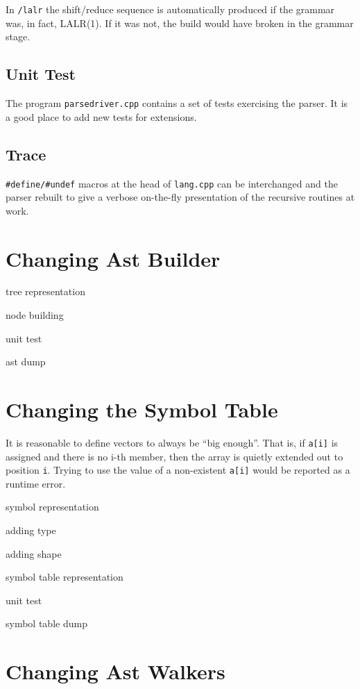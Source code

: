 In {\tt /lalr} the shift/reduce sequence is automatically produced if the grammar was, in fact, LALR(1).  If it was not, the build would have broken in the grammar stage.

\subsection{Unit Test}

The program {\tt parsedriver.cpp} contains a set of tests exercising the parser.
It is a good place to add new tests for extensions.

\subsection{Trace}

{\tt #define/#undef} macros at the head of {\tt lang.cpp} can be interchanged and the parser rebuilt to give a verbose on-the-fly presentation of the recursive routines at work.


\section{Changing Ast Builder}

tree representation

node building

unit test

ast dump

\section{Changing the Symbol Table}

It is reasonable to define
vectors to always be ``big enough''.  That is, if {\tt a[i]} is assigned and there is no i-th member, then the array is quietly extended out to position {\tt i}.  Trying to use the value of a non-existent {\tt a[i]} would be reported as a runtime error.  

symbol representation

adding type

adding shape

symbol table representation

unit test

symbol table dump

\section{Changing Ast Walkers}

